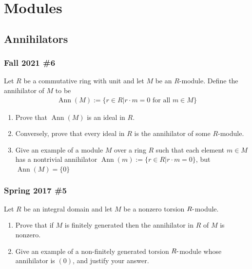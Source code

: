 \hypertarget{modules}{%
\section{Modules}\label{modules}}

\hypertarget{annihilators}{%
\subsection{Annihilators}\label{annihilators}}

\hypertarget{fall-2021-6}{%
\subsubsection{Fall 2021 \#6}\label{fall-2021-6}}

Let \(R\) be a commutative ring with unit and let \(M\) be an
\(R\)-module. Define the annihilator of \(M\) to be
\begin{align*}
\operatorname{Ann}(M):=\{r \in R \mathrel{\Big|}r \cdot m=0 \text { for all } m \in M\}
\end{align*}

\begin{enumerate}
\def\labelenumi{\alph{enumi}.}
\item
  Prove that \(\operatorname{Ann}(M)\) is an ideal in \(R\).
\item
  Conversely, prove that every ideal in \(R\) is the annihilator of some
  \(R\)-module.
\item
  Give an example of a module \(M\) over a ring \(R\) such that each
  element \(m \in M\) has a nontrivial annihilator
  \(\operatorname{Ann}(m):=\{r \in R \mathrel{\Big|}r \cdot m=0\}\), but
  \(\operatorname{Ann}(M)=\{0\}\)
\end{enumerate}

\hypertarget{spring-2017-5}{%
\subsubsection{Spring 2017 \#5}\label{spring-2017-5}}

Let \(R\) be an integral domain and let \(M\) be a nonzero torsion
\(R{\hbox{-}}\)module.

\begin{enumerate}
\def\labelenumi{\alph{enumi}.}
\item
  Prove that if \(M\) is finitely generated then the annihilator in
  \(R\) of \(M\) is nonzero.
\item
  Give an example of a non-finitely generated torsion
  \(R{\hbox{-}}\)module whose annihilator is \((0)\), and justify your
  answer.
\end{enumerate}

